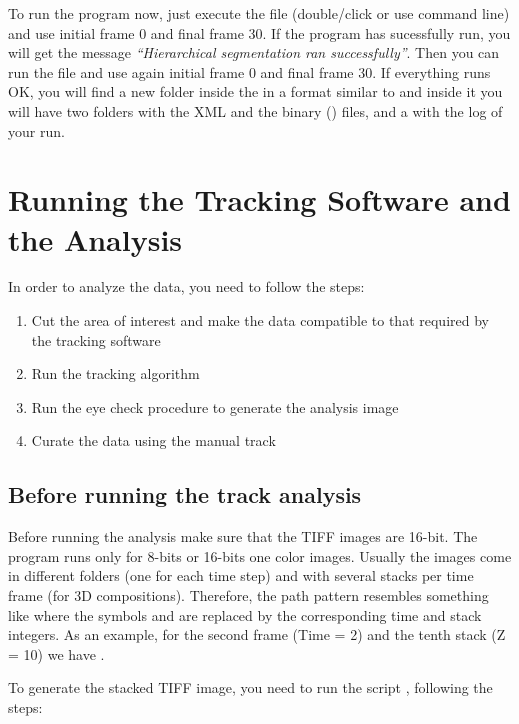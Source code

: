 \documentclass[12pt]{article}
\begin{document}
To run the program now, just execute the file  (double/click or use command line) and use initial frame 0 and final frame 30. If the program has sucessfully run, you will get the message \textit{``Hierarchical segmentation ran successfully''}. Then you can run the file  and use again initial frame 0 and final frame 30. If everything runs OK, you will find a new folder inside the  in a format similar to  and inside it you will have two folders with the XML and the binary () files, and a  with the log of your run.

\section{Running the Tracking Software and the Analysis}

In order to analyze the data, you need to follow the steps:

\begin{enumerate}
\item{Cut the area of interest and make the data compatible to that required by the tracking software}
\item{Run the tracking algorithm}
\item{Run the eye check procedure to generate the analysis image}
\item{Curate the data using the manual track}
\end{enumerate}

\subsection{Before running the track analysis} \label{sec_run_pre_track}

Before running the analysis make sure that the TIFF images are 16-bit. The program runs only for 8-bits or 16-bits one color images. Usually the images come in different folders (one for each time step) and with several stacks per time frame (for 3D compositions). Therefore, the path pattern resembles something like  where the symbols  and  are replaced by the corresponding time and stack integers. As an example, for the second frame (Time = 2) and the tenth stack (Z = 10) we have .

To generate the stacked TIFF image, you need to run the script , following the steps:
\end{document}
